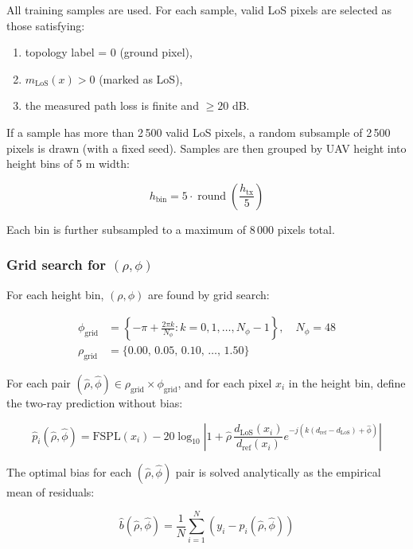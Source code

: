 All training samples are used. For each sample, valid LoS pixels are selected
as those satisfying:
\begin{enumerate}
\item topology label = 0 (ground pixel),
\item $m_{\mathrm{LoS}}(x) > 0$ (marked as LoS),
\item the measured path loss is finite and $\ge 20$ dB.
\end{enumerate}
If a sample has more than 2\,500 valid LoS pixels, a random subsample of
2\,500 pixels is drawn (with a fixed seed). Samples are then grouped by UAV
height into height bins of 5 m width:

\begin{equation}
h_{\mathrm{bin}} = 5 \cdot \operatorname{round}\!\left(\frac{h_{\mathrm{tx}}}{5}\right)
\end{equation}

Each bin is further subsampled to a maximum of 8\,000 pixels total.

\subsubsection{Grid search for $(\rho, \phi)$}

For each height bin, $(\rho, \phi)$ are found by grid search:

\begin{align}
\phi_{\mathrm{grid}} &= \left\{-\pi + \frac{2\pi k}{N_\phi} : k = 0, 1, \ldots, N_\phi - 1\right\},
\quad N_\phi = 48 \label{eq:phi_grid}\\
\rho_{\mathrm{grid}} &= \{0.00,\, 0.05,\, 0.10,\, \ldots,\, 1.50\}
\label{eq:rho_grid}
\end{align}

For each pair $(\hat\rho, \hat\phi) \in \rho_{\mathrm{grid}} \times
\phi_{\mathrm{grid}}$, and for each pixel $x_i$ in the height bin, define
the two-ray prediction without bias:

\begin{equation}
\hat p_i(\hat\rho, \hat\phi)
=
\mathrm{FSPL}(x_i)
- 20\log_{10}
\left|
1 + \hat\rho\,\frac{d_{\mathrm{LoS}}(x_i)}{d_{\mathrm{ref}}(x_i)}
e^{-j\left(k(d_{\mathrm{ref}}-d_{\mathrm{LoS}})+\hat\phi\right)}
\right|
\end{equation}

The optimal bias for each $(\hat\rho, \hat\phi)$ pair is solved analytically
as the empirical mean of residuals:

\begin{equation}
\hat b(\hat\rho, \hat\phi)
=
\frac{1}{N}\sum_{i=1}^{N}
\left(y_i - \hat p_i(\hat\rho, \hat\phi)\right)
\end{equation}

